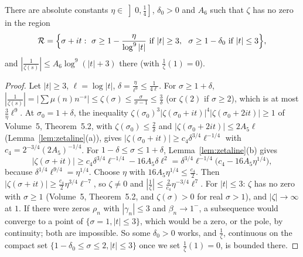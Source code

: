 \begin{lemma}\label{lem:invzeta}
There are absolute constants $\eta\in\left]0,\frac14\right]$, $\delta_0>0$ and $A_6$ such that $\zeta$ has no zero in the region
\[
\mathcal R=\Bigl\{\sigma+it:\ \sigma\ge1-\frac\eta{\log^9|t|}\text{ if }|t|\ge3,\ \ \sigma\ge1-\delta_0\text{ if }|t|\le3\Bigr\},
\]
and $|\frac1{\zeta(s)}|\le A_6\log^9(|t|+3)$ there (with $\frac1\zeta(1)=0$).
\end{lemma}
\begin{proof}
Let $|t|\ge3$, $\ell=\log|t|$, $\delta=\frac\eta{\ell^9}\le\frac1{4\ell}$. For $\sigma\ge1+\delta$, $|\frac1{\zeta(s)}|=|\sum\mu(n)n^{-s}|\le\zeta(\sigma)\le\frac\sigma{\sigma-1}\le\frac3\delta$ (or $\zeta(2)$ if $\sigma\ge2$), which is at most $\frac3\eta\ell^9$.
At $\sigma_0=1+\delta$, the inequality $\zeta(\sigma_0)^3|\zeta(\sigma_0+it)|^4|\zeta(\sigma_0+2it)|\ge1$ of Volume~5, Theorem~5.2, with $\zeta(\sigma_0)\le\frac2\delta$ and $|\zeta(\sigma_0+2it)|\le2A_5\ell$ (Lemma~\ref{lem:zetaline}(a)), gives $|\zeta(\sigma_0+it)|\ge c_4\delta^{3/4}\ell^{-1/4}$ with $c_4=2^{-3/4}(2A_5)^{-1/4}$. For $1-\delta\le\sigma\le1+\delta$, Lemma~\ref{lem:zetaline}(b) gives
\[
|\zeta(\sigma+it)|\ge c_4\delta^{3/4}\ell^{-1/4}-16A_5\delta\ell^2=\delta^{3/4}\ell^{-1/4}\bigl(c_4-16A_5\eta^{1/4}\bigr),
\]
because $\delta^{1/4}\ell^{9/4}=\eta^{1/4}$. Choose $\eta$ with $16A_5\eta^{1/4}\le\frac{c_4}2$. Then $|\zeta(\sigma+it)|\ge\frac{c_4}2\eta^{3/4}\ell^{-7}$, so $\zeta\ne0$ and $|\frac1\zeta|\le\frac2{c_4}\eta^{-3/4}\ell^7$.
For $|t|\le3$: $\zeta$ has no zero with $\sigma\ge1$ (Volume~5, Theorem~5.2, and $\zeta(\sigma)>0$ for real $\sigma>1$), and $|\zeta|\to\infty$ at $1$. If there were zeros $\rho_n$ with $|\gamma_n|\le3$ and $\beta_n\to1^-$, a subsequence would converge to a point of $\{\sigma=1,|t|\le3\}$, which would be a zero, or the pole, by continuity; both are impossible. So some $\delta_0>0$ works, and $\frac1\zeta$, continuous on the compact set $\{1-\delta_0\le\sigma\le2,|t|\le3\}$ once we set $\frac1\zeta(1)=0$, is bounded there.
\end{proof}


